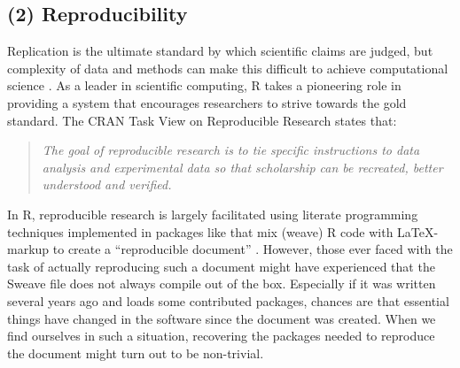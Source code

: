 \subsection{(2) Reproducibility}

Replication is the ultimate standard by which scientific claims are judged, but
complexity of data and methods can make this difficult to achieve computational
science \citep{peng2011reproducible}. As a leader in scientific computing, R
takes a pioneering role in providing a system that encourages researchers to strive
towards the gold standard. The CRAN Task View on Reproducible Research states
that:

\begin{quote}
\emph{The goal of reproducible research is to tie specific instructions
to data analysis and experimental data so that scholarship can be recreated,
better understood and verified.}
\end{quote}
In R, reproducible research is largely facilitated using literate programming
techniques implemented in packages like  that mix (weave) R code
with \LaTeX-markup to create a ``reproducible document''
\citep{leisch2002sweave}. However, those ever faced with the task of actually
reproducing such a document might have experienced that the Sweave file does not
always compile out of the box. Especially if it was written several years ago
and loads some contributed packages, chances are that essential things have
changed in the software since the document was created. When we find ourselves
in such a situation, recovering the packages needed to reproduce the document
might turn out to be non-trivial.

